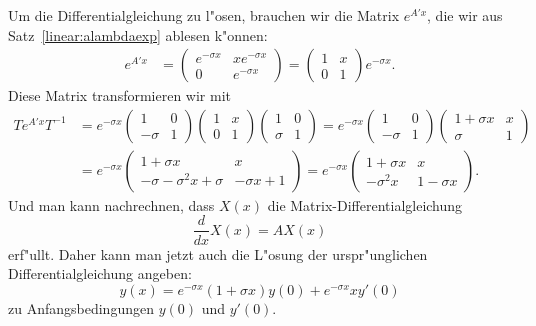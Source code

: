 \begin{beispiel}
Um die Differentialgleichung zu l"osen, brauchen wir die Matrix
$e^{A'x}$, die wir aus Satz~\ref{linear:alambdaexp} ablesen k"onnen:
\begin{align*}
e^{A'x}
&=
\begin{pmatrix}
e^{-\sigma x}&xe^{-\sigma x}\\
       0     & e^{-\sigma x}
\end{pmatrix}
=
\begin{pmatrix}
1&x\\
0&1
\end{pmatrix}
e^{-\sigma x}.
\end{align*}
Diese Matrix transformieren wir mit 
\begin{align*}
Te^{A'x}T^{-1}
&=
e^{-\sigma x}
\begin{pmatrix}
      1&0\\
-\sigma&1
\end{pmatrix}
\begin{pmatrix}
1&x\\
0&1
\end{pmatrix}
\begin{pmatrix}
     1&0\\
\sigma&1
\end{pmatrix}
=
e^{-\sigma x}
\begin{pmatrix}
      1&0\\
-\sigma&1
\end{pmatrix}
\begin{pmatrix}
1+\sigma x&x\\
  \sigma  &1
\end{pmatrix}
\\
&=
e^{-\sigma x}
\begin{pmatrix}
1+\sigma x& x\\
-\sigma-\sigma^2 x+\sigma&-\sigma x+1
\end{pmatrix}
=
e^{-\sigma x}
\begin{pmatrix}
1+\sigma   x&         x\\
 -\sigma^2 x&1-\sigma x
\end{pmatrix}.
\end{align*}
Und man kann nachrechnen, dass $X(x)$ die Matrix-Differentialgleichung
\[
\frac{d}{dx}X(x)=AX(x)
\]
erf"ullt.
Daher kann man jetzt auch die L"osung der urspr"unglichen 
Differentialgleichung angeben:
\[
y(x)=e^{-\sigma x}(1+\sigma x)y(0) + e^{-\sigma x}xy'(0)
\]
zu Anfangsbedingungen $y(0)$ und $y'(0)$.
\end{beispiel}

